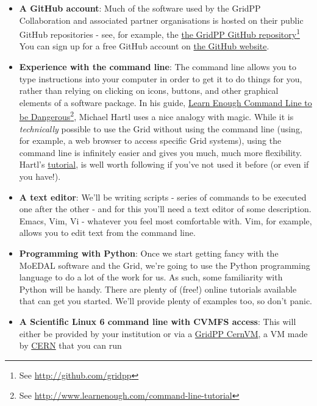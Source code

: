 \begin{itemize}
\tightlist
\item
  \textbf{A GitHub account}: Much of
  the software used by the GridPP Collaboration
  and associated partner organisations is hosted on their
  public GitHub repositories - see, for example, the
  \href{http://github.com/gridpp}{the GridPP GitHub repository}\footnote{%
See \href{http://github.com/gridpp}{http://github.com/gridpp}
} You can sign up for a free GitHub account on \href{http://github.com}{the
  GitHub website}.
\item
  \textbf{Experience with the command line}: The command line allows you
  to type instructions into your computer in order to get it to do
  things for you, rather than relying on clicking on icons, buttons, and
  other graphical elements of a software package. In his guide,
  \href{http://www.learnenough.com/command-line-tutorial}{Learn Enough
  Command Line to be Dangerous}\footnote{%
See \href{http://www.learnenough.com/command-line-tutorial}{http://www.learnenough.com/command-line-tutorial}
}, Michael Hartl uses a nice analogy with
  magic. While it is \emph{technically} possible to use the Grid without
  using the command line (using, for example, a web browser to access
  specific Grid systems), using the command line is infinitely easier
  and gives you much, much more flexibility. Hartl's
  \href{http://www.learnenough.com/command-line-tutorial}{tutorial}, is
  well worth following if you've not used it before (or even if you
  have!).
\item
  \textbf{A text editor}: We'll be writing scripts - series of commands
  to be executed one after the other - and for this you'll need a text
  editor of some description. Emacs, Vim, Vi - whatever you feel most
  comfortable with. Vim, for example, allows you to edit text from the
  command line.
\item
  \textbf{Programming with Python}: Once we start getting fancy with the
  \ac{MoEDAL} software and the
  Grid, we're going to use the Python programming language
  to do a lot of the work for us. 
  As such, some familiarity with Python will be handy. There are plenty of
  (free!) online tutorials available that can get you started. We'll
  provide plenty of examples too, so don't panic.
\item
  \textbf{A Scientific Linux 6 command line with CVMFS access}: This
  will either be provided by your institution or
  via a \href{../gridpp-cernvm/gridpp-cernvm.html}{GridPP CernVM}, a
  \acf{VM} made by \href{http://cern.home}{CERN} that you can run

\end{itemize}
